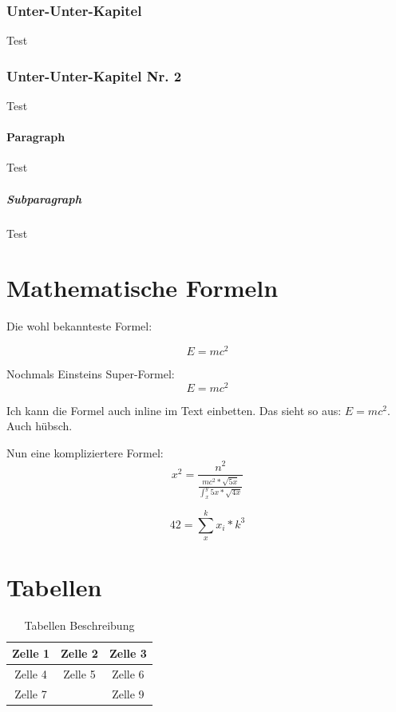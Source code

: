 \documentclass[a4paper,11pt]{article}
\begin{document}
\subsubsection{Unter-Unter-Kapitel}
Test

\subsubsection{Unter-Unter-Kapitel Nr. 2}
\label{sec:UUK2}
Test

\paragraph{Paragraph}
Test

\subparagraph{Subparagraph}
Test

\section{Mathematische Formeln}
Die wohl bekannteste Formel:

\begin{equation}
    E = mc^2  
\end{equation}

Nochmals Einsteins Super-Formel:
\[
E = mc^2
\]

Ich kann die Formel auch inline im Text einbetten. Das sieht so aus: $E = mc^2$. Auch hübsch.

Nun eine kompliziertere Formel:
\[
x^2 = \frac{n^2}{\frac{mc^2*\sqrt{5x}}{\int_{x}^{y}5x*\sqrt{4x}}}
\]

\[
42 = \sum_{x}^{k} x_i * k^3
\]

\section{Tabellen}

\begin{table}[h]
    \centering
    \begin{tabular}{|c||c|c|}
        \hline
        Zelle 1 & Zelle 2 & Zelle 3 \\ \hline\hline
        Zelle 4 & Zelle 5 & Zelle 6 \\ \hline
        Zelle 7 &         & Zelle 9 \\ \hline
    \end{tabular}
    \caption{Tabellen Beschreibung}
    \label{tab:placeholder}
\end{table}
\end{document}
